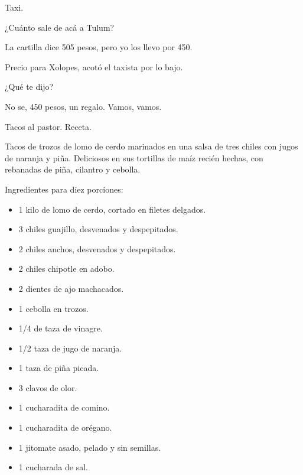 \documentclass[12pt,twoside,openright,a5paper]{book}
\begin{document}
\vspace{0.5cm}
\hrulefill\hspace{0.2cm} \decofourleft\decofourright \hspace{0.2cm} \hrulefill
\vspace{0.5cm}

Taxi.

¿Cuánto sale de acá a Tulum?

La cartilla dice 505 pesos, pero yo los llevo por 450.

Precio para Xolopes, acotó el taxista por lo bajo.

¿Qué te dijo?

No se, 450 pesos, un regalo. Vamos, vamos.


\vspace{0.5cm}
\hrulefill\hspace{0.2cm} \decofourleft\decofourright \hspace{0.2cm} \hrulefill
\vspace{0.5cm}

Tacos al pastor. Receta.

Tacos de trozos de lomo de cerdo marinados en una salsa de tres chiles
con jugos de naranja y piña. Deliciosos en sus tortillas de maíz recién
hechas, con rebanadas de piña, cilantro y cebolla.

Ingredientes para diez porciones:

\begin{itemize} \item 1 kilo de lomo de cerdo, cortado en filetes delgados.
\item 3 chiles guajillo, desvenados y despepitados.  \item 2 chiles anchos,
desvenados y despepitados.  \item 2 chiles chipotle en adobo.  \item 2
dientes de ajo machacados.  \item 1 cebolla en trozos.  \item 1/4 de taza
de vinagre.  \item 1/2 taza de jugo de naranja.  \item 1 taza de piña
picada.  \item 3 clavos de olor.  \item 1 cucharadita de comino.  \item 1
cucharadita de orégano.  \item 1 jitomate asado, pelado y sin semillas.
\item 1 cucharada de sal.  \end {itemize}
\end{document}
